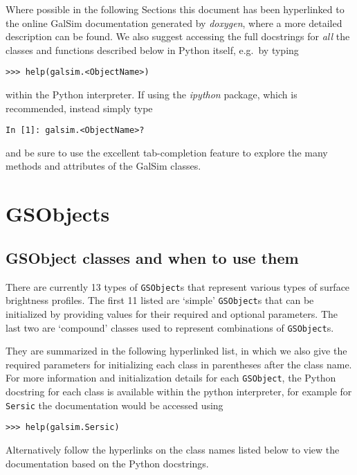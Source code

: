 \documentclass[preprint,11pt]{aastex}
\begin{document}
Where possible in the following Sections this document has been hyperlinked to the online
GalSim documentation generated by \emph{doxygen}, where a more detailed
description can be found.  We also suggest accessing the full docstrings for \emph{all} the
classes and functions described below in Python itself, e.g.\ by typing

{\tt >>> help(galsim.<ObjectName>)}

within the Python interpreter.  If using the \emph{ipython} package,
which is recommended, instead simply type

{\tt In [1]: galsim.<ObjectName>?}

and be sure to use the excellent tab-completion feature to explore the many
methods and attributes of the GalSim classes.

\newpage

\section{GSObjects}\label{sect:gsobjects}

\subsection{GSObject classes and when to use them}\label{sect:gsobjectclasses}
There are currently 13 types of \texttt{GSObject}s that represent
various types of surface brightness profiles. The first 11 listed are
`simple' \texttt{GSObject}s that can be initialized by providing
values for their required and optional parameters.  The last two are
`compound' classes used to represent combinations of
\texttt{GSObject}s.

They are summarized in the following hyperlinked list, in which we also give
the required parameters for initializing each class in parentheses
after the class name.  For more information and initialization details for each \texttt{GSObject},
the Python docstring for each class is available within the python interpreter, for example for
\texttt{Sersic} the documentation would be accessed using 

{\tt >>> help(galsim.Sersic)}

Alternatively follow the hyperlinks on
the class names listed below to view the documentation based
on the Python docstrings.
\end{document}

